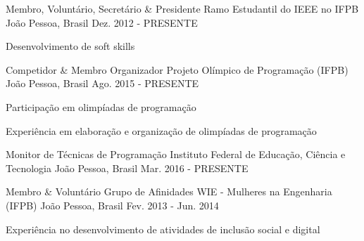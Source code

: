 \begin{cventries}
  
  \cventry
    {Membro, Voluntário, Secretário \& Presidente} %
    {Ramo Estudantil do IEEE no IFPB} %
    {João Pessoa, Brasil} %
    {Dez. 2012 - PRESENTE} %
    {
      \begin{cvitems} %
		\item{Desenvolvimento de soft skills}
      \end{cvitems}
    }
  
  \cventry
    {Competidor \& Membro Organizador} %
    {Projeto Olímpico de Programação (IFPB)} %
    {João Pessoa, Brasil} %
    {Ago. 2015 - PRESENTE} %
    {
      \begin{cvitems} %
        \item {Participação em olimpíadas de programação}
        \item {Experiência em elaboração e organização de olimpíadas de programação}
      \end{cvitems}
    } 
  
  \cventry
    {Monitor de Técnicas de Programação} %
    {Instituto Federal de Educação, Ciência e Tecnologia} %
    {João Pessoa, Brasil} %
    {Mar. 2016 - PRESENTE} %
    {
    }
  
  \cventry
    {Membro \& Voluntário} %
    {Grupo de Afinidades WIE - Mulheres na Engenharia (IFPB)} %
    {João Pessoa, Brasil} %
    {Fev. 2013 - Jun. 2014} %
    {
      \begin{cvitems} %
		\item{Experiência no desenvolvimento de atividades de inclusão social e digital}
      \end{cvitems}
    }
  

\end{cventries}
